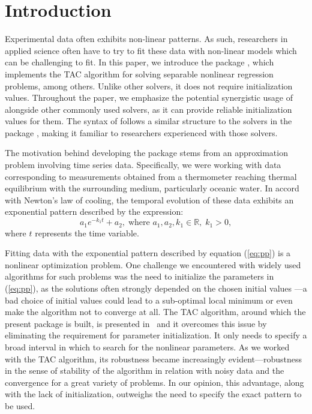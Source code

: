 \section{Introduction}
Experimental data often exhibits non-linear patterns. As such, researchers in applied science often have to try to fit these data with non-linear models which can be challenging to fit. In this paper, we introduce the  package \citep{package_nlstac}, which implements the TAC algorithm for solving separable nonlinear regression problems, among others. Unlike other solvers, it does not require initialization values. Throughout the paper, we emphasize the potential synergistic usage of  alongside other commonly used solvers, as it can provide reliable initialization values for them. The syntax of  follows a similar structure to the solvers in the  package \citep{package_minpacklm}, making it familiar to researchers experienced with those solvers.

The motivation behind developing the  package stems from an approximation problem involving time series data. Specifically, we were working with data corresponding to measurements obtained from a thermometer reaching thermal equilibrium with the surrounding medium, particularly oceanic water. In accord with Newton's law of cooling, the temporal evolution of these data exhibits an exponential pattern described by the expression:
\begin{equation}\label{eq:pp}
a_1 e^{-k_1t} + a_2, \; \text{where } a_1,a_2,k_1 \in \mathbb{R}, \; k_1>0,
\end{equation}
where $t$ represents the time variable.

Fitting data with the exponential pattern described by equation (\ref{eq:pp}) is a nonlinear optimization problem. One challenge we encountered with widely used algorithms for such problems was the need to initialize the parameters in (\ref{eq:pp}), as the solutions often strongly depended on the chosen initial values ---a bad choice of initial values could lead to a sub-optimal local minimum or even make the algorithm not to converge at all. The TAC algorithm, around which the present package is built, is presented in~\citet{tac} and it overcomes this issue by eliminating the requirement for parameter initialization. It only needs to specify a broad interval in which to search for the nonlinear parameters. As we worked with the TAC algorithm, its robustness became increasingly evident---robustness in the sense of stability of the algorithm in relation with noisy data and the convergence for a great variety of problems. In our opinion, this advantage, along with the lack of initialization, outweighs the need to specify the exact pattern to be used.


